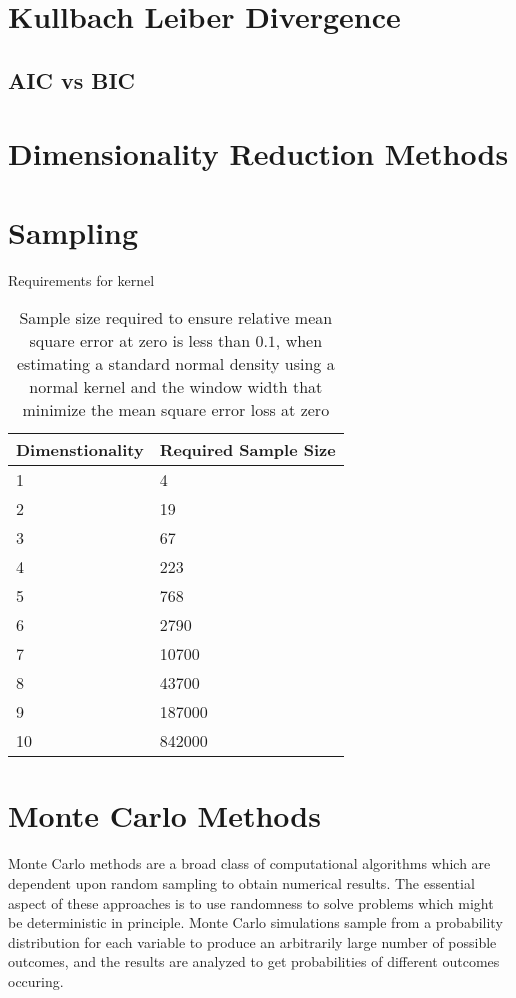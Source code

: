 \section{Kullbach Leiber Divergence}

\subsection{AIC vs BIC}

\section{Dimensionality Reduction Methods}

\section{Sampling}

Requirements for kernel
\begin{table}[htbp]
   \caption{Sample size required to ensure relative mean square error at zero is
       less than $0.1$, when estimating a standard normal density using a normal
       kernel and the window width that minimize the mean square error loss at
       zero\cite{silverman1986_density_estimation}}
   \label{tab:kde_sample_req}
   \begin{tabularx}{6.5in}{XX}
     \hline
     Dimenstionality & Required Sample Size \\
     \hline
     1 & 4 \\
     2 & 19 \\
     3 & 67 \\
     4 & 223 \\
     5 & 768 \\
     6 & 2790 \\
     7 & 10700 \\
     8 & 43700 \\
     9 & 187000 \\
     10 & 842000 \\
     \hline
   \end{tabularx}
\end{table}

\section{Monte Carlo Methods}

Monte Carlo methods are a broad class of computational algorithms which are dependent upon random sampling to obtain numerical results.
The essential aspect of these approaches is to use randomness to solve problems which might be deterministic in principle.
Monte Carlo simulations sample from a probability distribution for each variable to produce an arbitrarily large number of possible outcomes, and  the results are analyzed to get probabilities of different outcomes occuring.

